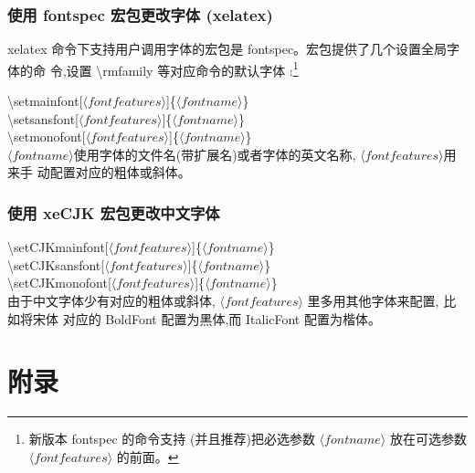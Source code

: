 \documentclass[a4paper]{ctexart}
\begin{document}
    \subsubsection{使用 fontspec 宏包更改字体 (xelatex)}
    xelatex 命令下支持用户调用字体的宏包是 fontspec。宏包提供了几个设置全局字体的命 令,设置 %
    \textbackslash rmfamily 等对应命令的默认字体 :\footnote{新版本 fontspec 的命令支持%
    (并且推荐)把必选参数 $\langle font name\rangle$ 放在可选参数$\langle font features\rangle$ 的前面。}\par
    \textbackslash setmainfont[$\langle font features\rangle$]\{$\langle font name\rangle$\} \\
    \textbackslash setsansfont[$\langle font features\rangle$]\{$\langle font name\rangle$\} \\
    \textbackslash setmonofont[$\langle font features\rangle$]\{$\langle font name\rangle$\}\\
    $\langle font name\rangle$使用字体的文件名(带扩展名)或者字体的英文名称, %
    $\langle font features\rangle$用来手 动配置对应的粗体或斜体。\par
    \subsubsection{使用 xeCJK 宏包更改中文字体}
    \textbackslash setCJKmainfont[$\langle font features\rangle$]\{$\langle font name\rangle$\} \\ 
    \textbackslash setCJKsansfont[$\langle font features\rangle$]\{$\langle font name\rangle$\} \\ 
    \textbackslash setCJKmonofont[$\langle font features\rangle$]\{$\langle font name\rangle$\}\\
    由于中文字体少有对应的粗体或斜体, $\langle font features\rangle$ 里多用其他字体来配置,%
    比如将宋体 对应的 BoldFont 配置为黑体,而 ItalicFont 配置为楷体。
    \newpage
    \appendix
    \section{附录}
\end{document}
